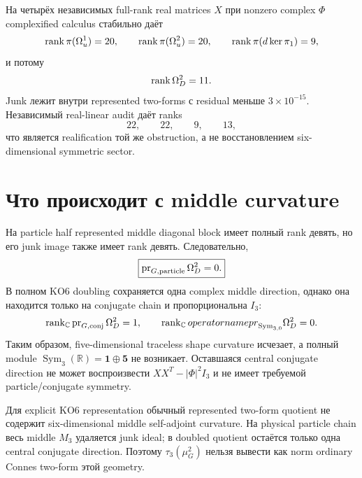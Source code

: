 На четырёх независимых full-rank real matrices \(X\) при nonzero complex
\(\Phi\) complexified calculus стабильно даёт
\begin{equation}
 \operatorname{rank}\pi(\Omega_u^1)=20,
 \qquad
 \operatorname{rank}\pi(\Omega_u^2)=20,
 \qquad
 \operatorname{rank}\pi(d\ker\pi_1)=9,
\end{equation}
и потому
\begin{equation}
 \operatorname{rank}\Omega_D^2=11.
 \label{eq:family-degree-two-quotient-rank}
\end{equation}
Junk лежит внутри represented two-forms с residual меньше
\(3\times10^{-15}\). Независимый real-linear audit даёт ranks
\begin{equation}
 22,
 \qquad 22,
 \qquad 9,
 \qquad 13,
\end{equation}
что является realification той же obstruction, а не восстановлением
six-dimensional symmetric sector.

\section{Что происходит с middle curvature}

На particle half represented middle diagonal block имеет полный rank девять,
но его junk image также имеет rank девять. Следовательно,
\begin{equation}
 \boxed{
 \operatorname{pr}_{G,\rm particle}\Omega_D^2=0.}
 \label{eq:family-particle-middle-twoform-zero}
\end{equation}
В полном KO6 doubling сохраняется одна complex middle direction, однако она
находится только на conjugate chain и пропорциональна \(I_3\):
\begin{equation}
 \operatorname{rank}_{\mathbb C}\operatorname{pr}_{G,\rm conj}\Omega_D^2=1,
 \qquad
 \operatorname{rank}_{\mathbb C}operatorname{pr}_{\operatorname{Sym}_{3,0}}
 \Omega_D^2=0.
 \label{eq:family-only-central-conjugate-twoform}
\end{equation}
Таким образом, five-dimensional traceless shape curvature исчезает, а
полный module
\(\operatorname{Sym}_3(\mathbb R)=\mathbf1\oplus\mathbf5\) не возникает.
Оставшаяся central conjugate direction не может воспроизвести
\(XX^T-|\Phi|^2I_3\) и не имеет требуемой particle/conjugate symmetry.

\begin{nogocriterion}
Для explicit KO6 representation обычный represented two-form quotient не
содержит six-dimensional middle self-adjoint curvature. На physical
particle chain весь middle \(M_3\) удаляется junk ideal; в doubled quotient
остаётся только одна central conjugate direction. Поэтому
\(\tau_3(\mu_G^2)\) нельзя вывести как norm ordinary Connes two-form этой
geometry.
\end{nogocriterion}

